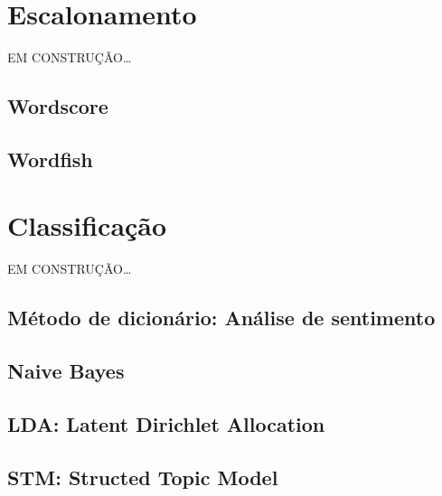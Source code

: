 \documentclass[]{book}
\begin{document}
\hypertarget{scalling}{%
\chapter{Escalonamento}\label{scalling}}

EM CONSTRUÇÃO\ldots{}

\hypertarget{wordscore}{%
\section{Wordscore}\label{wordscore}}

\hypertarget{wordfish}{%
\section{Wordfish}\label{wordfish}}

\hypertarget{classificacao}{%
\chapter{Classificação}\label{classificacao}}

EM CONSTRUÇÃO\ldots{}

\hypertarget{muxe9todo-de-dicionuxe1rio-anuxe1lise-de-sentimento}{%
\section{Método de dicionário: Análise de sentimento}\label{muxe9todo-de-dicionuxe1rio-anuxe1lise-de-sentimento}}

\hypertarget{naive-bayes}{%
\section{Naive Bayes}\label{naive-bayes}}

\hypertarget{lda-latent-dirichlet-allocation}{%
\section{LDA: Latent Dirichlet Allocation}\label{lda-latent-dirichlet-allocation}}

\hypertarget{stm-structed-topic-model}{%
\section{STM: Structed Topic Model}\label{stm-structed-topic-model}}


\end{document}
